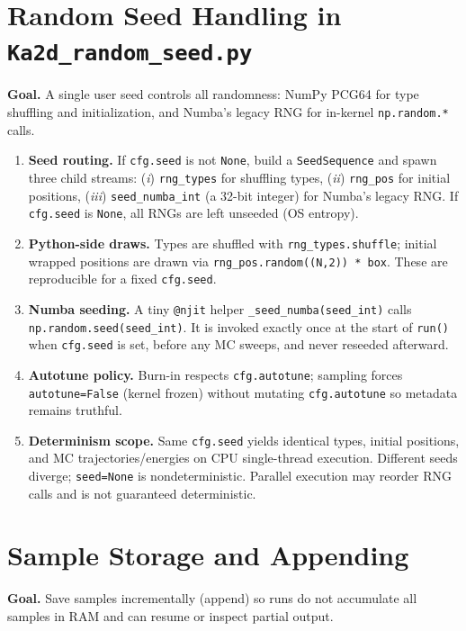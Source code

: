 \documentclass[11pt]{article}
\begin{document}
\section*{Random Seed Handling in \texttt{Ka2d\_random\_seed.py}}
\textbf{Goal.} A single user seed controls all randomness: NumPy PCG64 for type shuffling and initialization, and Numba's legacy RNG for in-kernel \texttt{np.random.*} calls.

\begin{enumerate}
  \item \textbf{Seed routing.} If \texttt{cfg.seed} is not \texttt{None}, build a \texttt{SeedSequence} and spawn three child streams: (\textit{i}) \texttt{rng\_types} for shuffling types, (\textit{ii}) \texttt{rng\_pos} for initial positions, (\textit{iii}) \texttt{seed\_numba\_int} (a 32-bit integer) for Numba's legacy RNG. If \texttt{cfg.seed} is \texttt{None}, all RNGs are left unseeded (OS entropy).
  \item \textbf{Python-side draws.} Types are shuffled with \texttt{rng\_types.shuffle}; initial wrapped positions are drawn via \texttt{rng\_pos.random((N,2)) * box}. These are reproducible for a fixed \texttt{cfg.seed}.
  \item \textbf{Numba seeding.} A tiny \texttt{@njit} helper \texttt{\_seed\_numba(seed\_int)} calls \texttt{np.random.seed(seed\_int)}. It is invoked exactly once at the start of \texttt{run()} when \texttt{cfg.seed} is set, before any MC sweeps, and never reseeded afterward.
  \item \textbf{Autotune policy.} Burn-in respects \texttt{cfg.autotune}; sampling forces \texttt{autotune=False} (kernel frozen) without mutating \texttt{cfg.autotune} so metadata remains truthful.
\item \textbf{Determinism scope.} Same \texttt{cfg.seed} yields identical types, initial positions, and MC trajectories/energies on CPU single-thread execution. Different seeds diverge; \texttt{seed=None} is nondeterministic. Parallel execution may reorder RNG calls and is not guaranteed deterministic.
\end{enumerate}

\section*{Sample Storage and Appending}
\textbf{Goal.} Save samples incrementally (append) so runs do not accumulate all samples in RAM and can resume or inspect partial output.
\end{document}
